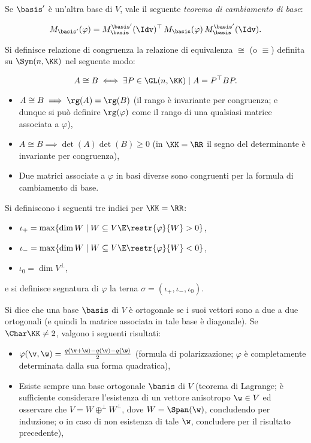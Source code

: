 \documentclass[10pt,landscape]{article}
\begin{document}
\begin{multicols}{3}
		Se $\basis'$ è un'altra base di $V$, vale il seguente \textit{teorema di cambiamento di base}:
		
		\[ M_{\basis'}(\varphi) = M_{\basis}^{\basis'}(\Idv)^\top \, M_\basis(\varphi) \, M_{\basis}^{\basis'}(\Idv). \]
		
		Si definisce relazione di congruenza la relazione di equivalenza $\cong$ (o $\equiv$) definita
		su $\Sym(n, \KK)$ nel seguente modo:
		
		\[ A \cong B \iff \exists P \in \GL(n, \KK) \mid A = P^\top B P. \]
		
		
		\begin{itemize}
			\item $A \cong B \implies \rg(A) = \rg(B)$ (il rango è invariante per congruenza; e dunque si può
			definire $\rg(\varphi)$ come il rango di una qualsiasi matrice associata a $\varphi$),
			\item $A \cong B \implies \det(A) \det(B) \geq 0$ (in $\KK = \RR$ il segno del determinante è invariante per congruenza),
			\item Due matrici associate a $\varphi$ in basi diverse sono congruenti per la formula
			di cambiamento di base.
		\end{itemize}
		
		Si definiscono i seguenti tre indici per $\KK = \RR$:
		
		\begin{itemize}
			\item $\iota_+ = \max\{ \dim W \mid W \subseteq V \E \restr{\varphi}{W} > 0 \}$,
			\item $\iota_- = \max\{ \dim W \mid W \subseteq V \E \restr{\varphi}{W} < 0 \}$,
			\item $\iota_0 = \dim V^\perp$,
		\end{itemize}
		
		e si definisce segnatura di $\varphi$ la terna $\sigma = (\iota_+, \iota_-, \iota_0)$.
		
		Si dice che una base $\basis$ di $V$ è ortogonale se i suoi vettori sono a due a due ortogonali (e
		quindi la matrice associata in tale base è diagonale). Se $\Char \KK \neq 2$, valgono i seguenti risultati:
		
		\begin{itemize}
			\item $\varphi(\v, \w) = \frac{q(\v + \w) - q(\v) - q(\w)}{2}$ (formula di polarizzazione; $\varphi$ è
			completamente determinata dalla sua forma quadratica),
			
			\item Esiste sempre una base ortogonale $\basis$ di $V$ (teorema di Lagrange; è sufficiente considerare
			l'esistenza di un vettore anisotropo $\w \in V$ ed osservare che $V = W \oplus^\perp W^\perp$, dove $W = \Span(\w)$, concludendo per induzione; o in caso di non esistenza di tale $\w$, concludere per il
			risultato precedente),
			

\end{itemize}
\end{multicols}
\end{document}
